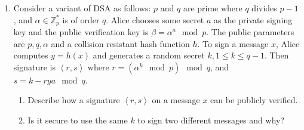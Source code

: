 \documentclass{article}
\begin{document}
\begin{enumerate}
\begin{enumerate}
        \begin{proof}
          Suppose that the RSA problem is hard. Then RSA cannot be solved in
          polynomial time. Consider an experiment in which an attacker
          $\mathcal{A}$ is given a public key $\left<N, e\right>$ and uniform $m
          \in \mathbb{Z}^{*}_N$. Since RSA cannot be solved in polynomial time,
          $\mathcal{A}$ must make some queries to the
          $\textsf{Sign}_{sk}(\cdot)$ oracle to create a $(m, \gamma)$ pair to
          forge. This information is provided to the oracle, implies that $m \in
          \mathcal{M}$ and $\mathcal{A}$ cannot provide $m$ as output in the
          experiment. Furthermore, $\mathcal{A}$ cannot bear RSA by chance
          (since we supposed RSA is hard). Since $\mathcal{A}$ cannot succeed,
          the plain RSA scheme satisfies the weak definition of security.
        \end{proof}
    \end{enumerate}
  \item Consider a variant of DSA as follows: $p$ and $q$ are prime where $q$
    divides $p - 1$, and $\alpha \in \mathbb{Z}^{*}_p$ is of order $q$. Alice chooses
    some secret $a$ as the private signing key and the public verification key
    is $\beta = \alpha^a \mod p$. The public parameters are $p, q, \alpha$ and a
    collision resistant hash function $h$. To sign a message $x$, Alice computes
    $y = h(x)$ and generates a random secret $k, 1 \leq k \leq q - 1$. Then
    signature is $\left<r, s\right>$ where $r = (\alpha^k \mod p) \mod q$, and
    $s = k - rya \mod q$.
    \begin{enumerate}
      \item Describe how a signature $\left<r, s\right>$ on a message $x$ can be
        publicly verified.
      \item Is it secure to use the same $k$ to sign two different messages and
        why?
    \end{enumerate}
\end{enumerate}
\end{document}
